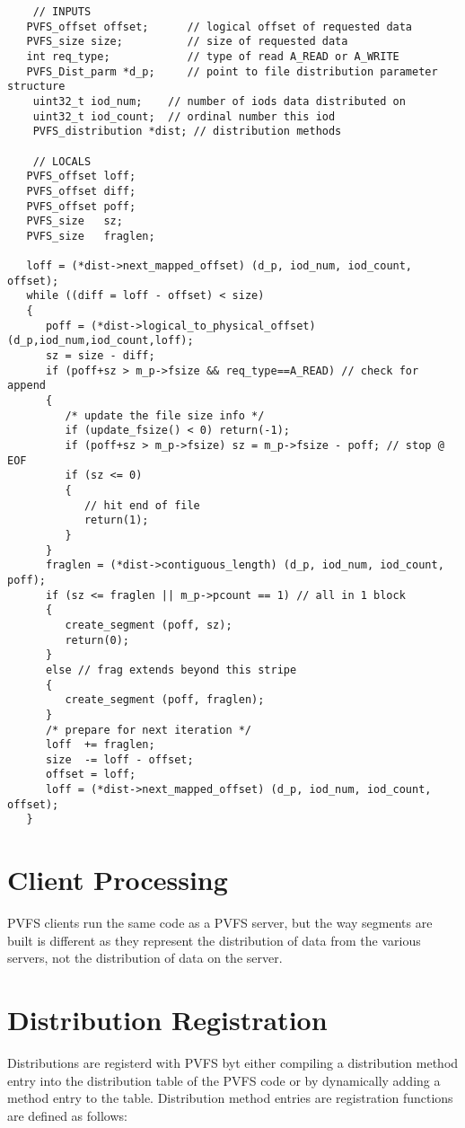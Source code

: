 \documentclass[11pt]{article}
\begin{document}
\begin{verbatim}
	// INPUTS
   PVFS_offset offset;      // logical offset of requested data
   PVFS_size size;          // size of requested data
   int req_type;            // type of read A_READ or A_WRITE
   PVFS_Dist_parm *d_p;     // point to file distribution parameter structure
	uint32_t iod_num;    // number of iods data distributed on
	uint32_t iod_count;  // ordinal number this iod
	PVFS_distribution *dist; // distribution methods

	// LOCALS
   PVFS_offset loff;
   PVFS_offset diff;
   PVFS_offset poff;
   PVFS_size   sz;
   PVFS_size   fraglen;

   loff = (*dist->next_mapped_offset) (d_p, iod_num, iod_count, offset);
   while ((diff = loff - offset) < size)
   {
      poff = (*dist->logical_to_physical_offset)(d_p,iod_num,iod_count,loff);
      sz = size - diff;
      if (poff+sz > m_p->fsize && req_type==A_READ) // check for append 
      {
         /* update the file size info */
         if (update_fsize() < 0) return(-1);
         if (poff+sz > m_p->fsize) sz = m_p->fsize - poff; // stop @ EOF
         if (sz <= 0)
         {
            // hit end of file
            return(1);
         }
      }
      fraglen = (*dist->contiguous_length) (d_p, iod_num, iod_count, poff);
      if (sz <= fraglen || m_p->pcount == 1) // all in 1 block
      {
         create_segment (poff, sz);
         return(0);
      }
      else // frag extends beyond this stripe
      {
         create_segment (poff, fraglen);
      }
      /* prepare for next iteration */
      loff  += fraglen;
      size  -= loff - offset;
      offset = loff;
      loff = (*dist->next_mapped_offset) (d_p, iod_num, iod_count, offset);
   }
\end{verbatim}

\section{Client Processing}

PVFS clients run the same code as a PVFS server, but the way segments
are built is different as they represent the distribution of data from
the various servers, not the distribution of data on the server.

\section{Distribution Registration}

Distributions are registerd with PVFS byt either compiling a
distribution method entry into the distribution table of the PVFS code
or by dynamically adding a method entry to the table.   Distribution
method entries are registration functions are defined as follows:
\end{document}
